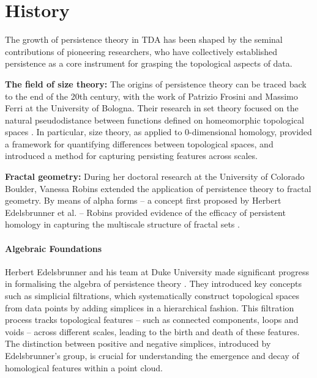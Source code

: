 \section{History}
The growth of persistence theory in TDA has been shaped by the seminal contributions of pioneering researchers, who have collectively established persistence as a core instrument for grasping the topological aspects of data.

\textbf{The field of size theory:} The origins of persistence theory can be traced back to the end of the 20th century, with the work of Patrizio Frosini and Massimo Ferri at the University of Bologna. Their research in set theory focused on the natural pseudodistance between functions defined on homeomorphic topological spaces \cite{Frosini1999,Ferri1998}. In particular, size theory, as applied to $0$-dimensional homology, provided a framework for quantifying differences between topological spaces, and introduced a method for capturing persisting features across scales.

\textbf{Fractal geometry:} During her doctoral research at the University of Colorado Boulder, Vanessa Robins extended the application of persistence theory to fractal geometry. By means of alpha forms -- a concept first proposed by Herbert Edelsbrunner et al. -- Robins provided evidence of the efficacy of persistent homology in capturing the multiscale structure of fractal sets \cite{Robins2000, Edelsbrunner1994}.

\paragraph*{Algebraic Foundations}
Herbert Edelsbrunner and his team at Duke University made significant progress in formalising the algebra of persistence theory \cite{Edelsbrunner2000}. They introduced key concepts such as simplicial filtrations, which systematically construct topological spaces from data points by adding simplices in a hierarchical fashion. This filtration process tracks topological features -- such as connected components, loops and voids -- across different scales, leading to the birth and death of these features. The distinction between positive and negative simplices, introduced by Edelsbrunner's group, is crucial for understanding the emergence and decay of homological features within a point cloud. 

